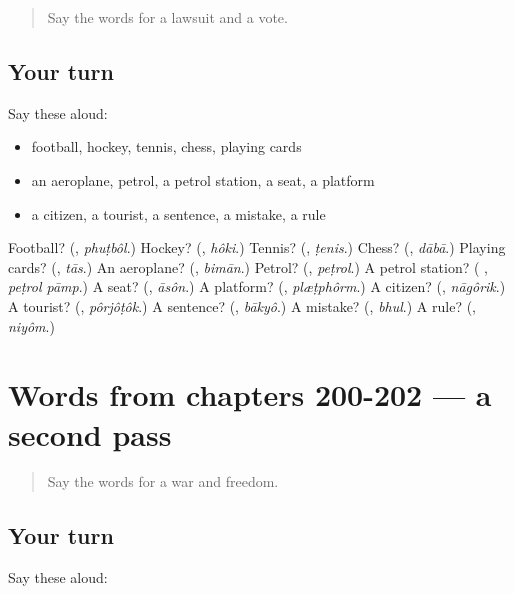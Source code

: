 \label{lesson:BN-R202-first-pass-words-from-chapters-197-199}



\begin{quote}
Say the words for a lawsuit and a vote.
\end{quote}

\subsection*{Your turn}
Say these aloud:

\begin{itemize}
\raggedright
  \item football, hockey, tennis, chess, playing cards
  \item an aeroplane, petrol, a petrol station, a seat, a platform
  \item a citizen, a tourist, a sentence, a mistake, a rule
\end{itemize}

\begin{tcolorbox}[breakable,colback=teal!4,colframe=teal!35!black,title={Before you move on}]
Football? (\textbf{}, \emph{phuṭbôl}.) Hockey? (\textbf{}, \emph{hôki}.) Tennis? (\textbf{}, \emph{ṭenis}.) Chess? (\textbf{}, \emph{dābā}.) Playing cards? (\textbf{}, \emph{tās}.) An aeroplane? (\textbf{}, \emph{bimān}.) Petrol? (\textbf{}, \emph{peṭrol}.) A petrol station? (\textbf{ }, \emph{peṭrol pāmp}.) A seat? (\textbf{}, \emph{āsôn}.) A platform? (\textbf{}, \emph{plæṭphôrm}.) A citizen? (\textbf{}, \emph{nāgôrik}.) A tourist? (\textbf{}, \emph{pôrjôṭôk}.) A sentence? (\textbf{}, \emph{bākyô}.) A mistake? (\textbf{}, \emph{bhul}.) A rule? (\textbf{}, \emph{niyôm}.)
\end{tcolorbox}
\section[(dialogue)]{Words from chapters 200-202 — a second pass}

\label{lesson:BN-R202-second-pass-words-from-chapters-200-202}



\begin{quote}
Say the words for a war and freedom.
\end{quote}

\subsection*{Your turn}
Say these aloud:

